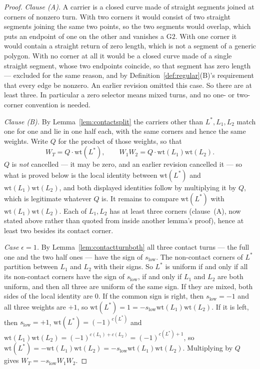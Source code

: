 \begin{proof}
\emph{Clause (A).} A carrier is a closed curve made of straight segments joined at corners of
nonzero turn. With two corners it would consist of two straight segments
joining the same two points, so the two segments would overlap, which puts an
endpoint of one on the other and vanishes a $\mathrm{G2}$. With one corner it
would contain a straight return of zero length, which is not a segment of a
generic polygon. With no corner at all it would be a closed curve made of a
single straight segment, whose two endpoints coincide, so that segment has zero
length --- excluded for the same reason, and by
Definition~\ref{def:regular}(B)'s requirement that every edge be nonzero. An
earlier revision omitted this case. So there are at least three. In particular a zero selector
means mixed turns, and no one- or two-corner convention is needed.

\emph{Clause (B).} By Lemma~\ref{lem:contactsplit} the carriers other than $L^{*},L_1,L_2$ match
one for one and lie in one half each, with the same corners and hence the same
weights. Write $Q$ for the product of those weights, so that
\[
   W_T=Q\cdot\mathrm{wt}(L^{*}),
   \qquad
   W_1W_2=Q\cdot\mathrm{wt}(L_1)\mathrm{wt}(L_2).
\]
$Q$ is \emph{not} cancelled --- it may be zero, and an earlier revision
cancelled it --- so what is proved below is the local identity between
$\mathrm{wt}(L^{*})$ and $\mathrm{wt}(L_1)\mathrm{wt}(L_2)$, and both displayed
identities follow by multiplying it by $Q$, which is legitimate whatever $Q$ is.
It remains to compare $\mathrm{wt}(L^{*})$ with
$\mathrm{wt}(L_1)\mathrm{wt}(L_2)$. Each of $L_1,L_2$ has at least three
corners (clause~(A), now stated above rather than quoted from
inside another lemma's proof), hence at least two besides its
contact corner.

\emph{Case $\epsilon=1$.} By Lemma~\ref{lem:contactturnboth} all three contact
turns --- the full one and the two half ones --- have the sign of
$s_{\mathrm{low}}$. The non-contact corners of $L^{*}$ partition between $L_1$
and $L_2$ with their signs. So $L^{*}$ is uniform if and only if all its
non-contact corners have the sign of $s_{\mathrm{low}}$, if and only if $L_1$
and $L_2$ are both uniform, and then all
three are uniform of the same sign. If they are mixed, both sides of the
local identity are $0$. If the common sign is right, then $s_{\mathrm{low}}=-1$
and all three weights are $+1$, so
$\mathrm{wt}(L^{*})=1=-s_{\mathrm{low}}\mathrm{wt}(L_1)\mathrm{wt}(L_2)$. If it
is left, then $s_{\mathrm{low}}=+1$, $\mathrm{wt}(L^{*})=(-1)^{c(L^{*})}$ and
$\mathrm{wt}(L_1)\mathrm{wt}(L_2)=(-1)^{c(L_1)+c(L_2)}=(-1)^{c(L^{*})+1}$, so
$\mathrm{wt}(L^{*})=-\mathrm{wt}(L_1)\mathrm{wt}(L_2)
=-s_{\mathrm{low}}\mathrm{wt}(L_1)\mathrm{wt}(L_2)$. Multiplying by $Q$ gives
$W_T=-s_{\mathrm{low}}W_1W_2$.


\end{proof}
